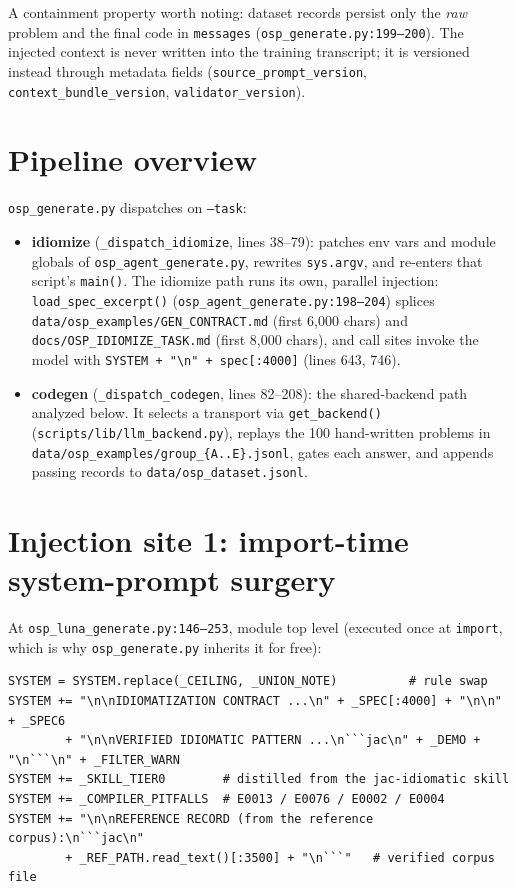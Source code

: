 \documentclass[11pt]{article}
\newcommand{\file}[1]{\texttt{#1}}
\newcommand{\code}[1]{\texttt{#1}}
\begin{document}
A containment property worth noting: dataset records persist only the
\emph{raw} problem and the final code in \code{messages}
(\file{osp\_generate.py:199--200}). The injected context is never written into
the training transcript; it is versioned instead through metadata fields
(\code{source\_prompt\_version}, \code{context\_bundle\_version},
\code{validator\_version}).

\section{Pipeline overview}

\file{osp\_generate.py} dispatches on \code{--task}:

\begin{itemize}
  \item \textbf{idiomize} (\file{\_dispatch\_idiomize}, lines 38--79): patches
  env vars and module globals of \file{osp\_agent\_generate.py}, rewrites
  \code{sys.argv}, and re-enters that script's \code{main()}. The idiomize
  path runs its own, parallel injection:
  \code{load\_spec\_excerpt()} (\file{osp\_agent\_generate.py:198--204})
  splices \file{data/osp\_examples/GEN\_CONTRACT.md} (first 6{,}000 chars) and
  \file{docs/OSP\_IDIOMIZE\_TASK.md} (first 8{,}000 chars), and call sites
  invoke the model with \code{SYSTEM + "\textbackslash n" + spec[:4000]}
  (lines 643, 746).
  \item \textbf{codegen} (\file{\_dispatch\_codegen}, lines 82--208): the
  shared-backend path analyzed below. It selects a transport via
  \code{get\_backend()} (\file{scripts/lib/llm\_backend.py}), replays the 100
  hand-written problems in \file{data/osp\_examples/group\_\{A..E\}.jsonl},
  gates each answer, and appends passing records to
  \file{data/osp\_dataset.jsonl}.
\end{itemize}

\section{Injection site 1: import-time system-prompt surgery}

At \file{osp\_luna\_generate.py:146--253}, module top level (executed once at
\code{import}, which is why \file{osp\_generate.py} inherits it for free):

\begin{lstlisting}[numbers=none]
SYSTEM = SYSTEM.replace(_CEILING, _UNION_NOTE)          # rule swap
SYSTEM += "\n\nIDIOMATIZATION CONTRACT ...\n" + _SPEC[:4000] + "\n\n" + _SPEC6
        + "\n\nVERIFIED IDIOMATIC PATTERN ...\n```jac\n" + _DEMO + "\n```\n" + _FILTER_WARN
SYSTEM += _SKILL_TIER0        # distilled from the jac-idiomatic skill
SYSTEM += _COMPILER_PITFALLS  # E0013 / E0076 / E0002 / E0004
SYSTEM += "\n\nREFERENCE RECORD (from the reference corpus):\n```jac\n"
        + _REF_PATH.read_text()[:3500] + "\n```"   # verified corpus file
\end{lstlisting}
\end{document}
